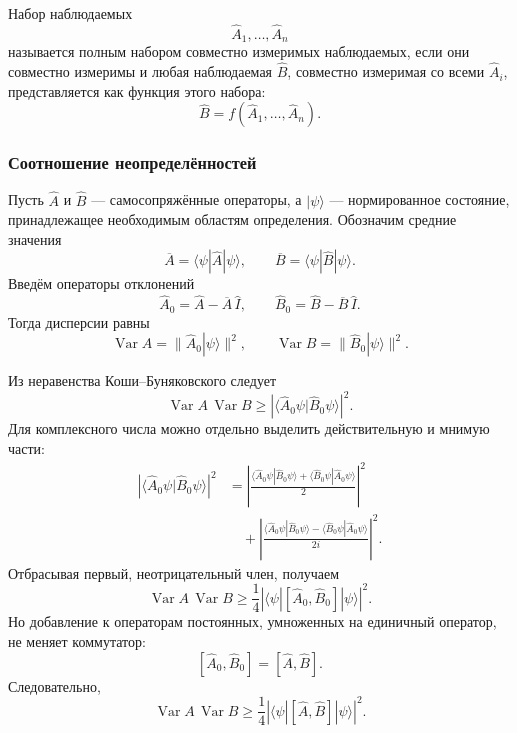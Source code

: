 \documentclass[12pt,a4paper]{article}
\begin{document}
Набор наблюдаемых
\[
    \hat A_1,\ldots,\hat A_n
\]
называется полным набором совместно измеримых наблюдаемых, если они
совместно измеримы и любая наблюдаемая $\hat B$, совместно измеримая
со всеми $\hat A_i$, представляется как функция этого набора:
\[
    \boxed{
        \hat B
        =
        f(\hat A_1,\ldots,\hat A_n)
    }.
\]


\subsubsection{Соотношение неопределённостей}

Пусть $\hat A$ и $\hat B$ --- самосопряжённые операторы, а
$|\psi\rangle$ --- нормированное состояние, принадлежащее необходимым
областям определения. Обозначим средние значения
\[
    \overline A
    =
    \langle\psi|\hat A|\psi\rangle,
    \qquad
    \overline B
    =
    \langle\psi|\hat B|\psi\rangle.
\]
Введём операторы отклонений
\[
    \boxed{
        \hat A_0
        =
        \hat A-\overline A\,\hat I,
        \qquad
        \hat B_0
        =
        \hat B-\overline B\,\hat I
    }.
\]
Тогда дисперсии равны
\[
    \boxed{
        \operatorname{Var}A
        =
        \|\hat A_0|\psi\rangle\|^2,
        \qquad
        \operatorname{Var}B
        =
        \|\hat B_0|\psi\rangle\|^2
    }.
\]

Из неравенства Коши--Буняковского следует
\[
    \operatorname{Var}A\,
    \operatorname{Var}B
    \geq
    \left|
        \langle
            \hat A_0\psi
            |
            \hat B_0\psi
        \rangle
    \right|^2.
\]
Для комплексного числа можно отдельно выделить действительную и
мнимую части:
\begin{align*}
    \left|
        \langle\hat A_0\psi|\hat B_0\psi\rangle
    \right|^2
    &=
    \left|
        \frac{
            \langle\hat A_0\psi|\hat B_0\psi\rangle
            +
            \langle\hat B_0\psi|\hat A_0\psi\rangle
        }{2}
    \right|^2
    \\
    &\quad+
    \left|
        \frac{
            \langle\hat A_0\psi|\hat B_0\psi\rangle
            -
            \langle\hat B_0\psi|\hat A_0\psi\rangle
        }{2i}
    \right|^2.
\end{align*}
Отбрасывая первый, неотрицательный член, получаем
\[
    \operatorname{Var}A\,
    \operatorname{Var}B
    \geq
    \frac14
    \left|
        \langle\psi|
            [\hat A_0,\hat B_0]
        |\psi\rangle
    \right|^2.
\]
Но добавление к операторам постоянных, умноженных на единичный
оператор, не меняет коммутатор:
\[
    [\hat A_0,\hat B_0]
    =
    [\hat A,\hat B].
\]
Следовательно,
\[
    \boxed{
    \operatorname{Var}A\,
    \operatorname{Var}B
    \geq
    \frac14
    \left|
        \langle\psi|
            [\hat A,\hat B]
        |\psi\rangle
    \right|^2
    }.
\]
\end{document}
